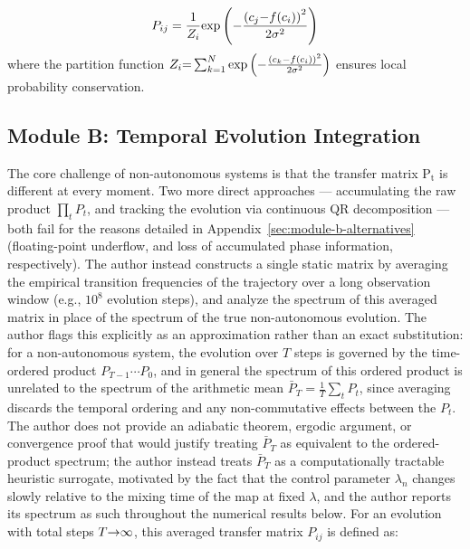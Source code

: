 \documentclass[mca,article,submit,oneauthor,pdftex]{Definitions/mdpi}
\begin{document}
\begin{equation}
P_{ij}=\frac{\text{1}}{Z_{i}}\text{exp}\left( \text{\ensuremath{-}}\frac{\text{(}{c}_{{j}}\text{\ensuremath{-}}{f}\text{(}{c}_{{i}}\text{)}\text{)}^{\text{2}}}{\text{2}\text{\ensuremath{\sigma}}^{\text{2}}} \right)
\end{equation}
where the partition function
  \({Z}_{{i}}\text{=}\sum_{{k}\text{=1}}^{{N}}\text{exp}\left( \text{\ensuremath{-}}\frac{\text{(}{c}_{{k}}\text{\ensuremath{-}}{f}\text{(}{c}_{{i}}\text{)}\text{)}^{\text{2}}}{\text{2}\text{\ensuremath{\sigma}}^{\text{2}}} \right)\)
  ensures local probability conservation.


\subsection{Module B: Temporal Evolution Integration}

The core challenge of non-autonomous systems is that the transfer matrix
\(\text{P}_{\text{t}}\) is different at every moment. Two more direct
approaches --- accumulating the raw product $\prod_t P_t$, and tracking the
evolution via continuous QR decomposition --- both fail for the reasons
detailed in Appendix~\ref{sec:module-b-alternatives} (floating-point
underflow, and loss of accumulated phase information, respectively). The
author instead constructs a single static matrix by
averaging the empirical transition frequencies of the
trajectory over a long
observation window (e.g., \(\text{10}^{\text{8}}\) evolution steps),
and analyze the spectrum of this averaged matrix in place of the
spectrum of the true non-autonomous evolution. The author flags this explicitly
as an approximation rather than an exact substitution: for a
non-autonomous system, the evolution over $T$ steps is governed by the
time-ordered product $P_{T-1}\cdots P_0$, and in general the spectrum of
this ordered product is unrelated to the spectrum of the arithmetic mean
$\bar P_T=\frac{1}{T}\sum_t P_t$, since averaging discards the temporal
ordering and any non-commutative effects between the $P_t$. The author does not
provide an adiabatic theorem, ergodic argument, or convergence proof
that would justify treating $\bar P_T$ as equivalent to the ordered-product
spectrum; the author instead treats $\bar P_T$ as a computationally tractable
heuristic surrogate, motivated by the fact that the control parameter
$\lambda_n$ changes slowly relative to the mixing time of the map at
fixed $\lambda$, and the author reports its spectrum as such throughout the
numerical results below. For an evolution with total steps
\({T}\text{\ensuremath{\rightarrow}\ensuremath{\infty}}\), this averaged transfer matrix
\({P}_{{ij}}\) is defined as:
\end{document}
